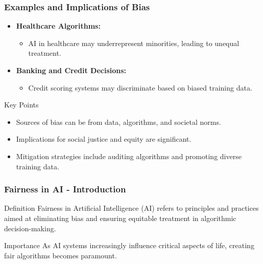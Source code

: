 \documentclass[aspectratio=169]{beamer}
\begin{document}
\begin{frame}[fragile]
    \frametitle{Examples and Implications of Bias}
    \begin{itemize}
        \item \textbf{Healthcare Algorithms:}
            \begin{itemize}
                \item AI in healthcare may underrepresent minorities, leading to unequal treatment.
            \end{itemize}
        \item \textbf{Banking and Credit Decisions:}
            \begin{itemize}
                \item Credit scoring systems may discriminate based on biased training data.
            \end{itemize}
    \end{itemize}

    \begin{block}{Key Points}
        \begin{itemize}
            \item Sources of bias can be from data, algorithms, and societal norms.
            \item Implications for social justice and equity are significant.
            \item Mitigation strategies include auditing algorithms and promoting diverse training data.
        \end{itemize}
    \end{block}
\end{frame}

\begin{frame}[fragile]
    \frametitle{Fairness in AI - Introduction}
    \begin{block}{Definition}
        Fairness in Artificial Intelligence (AI) refers to principles and practices aimed at eliminating bias and ensuring equitable treatment in algorithmic decision-making.
    \end{block}
    \begin{block}{Importance}
        As AI systems increasingly influence critical aspects of life, creating fair algorithms becomes paramount.
    \end{block}
\end{frame}
\end{document}
